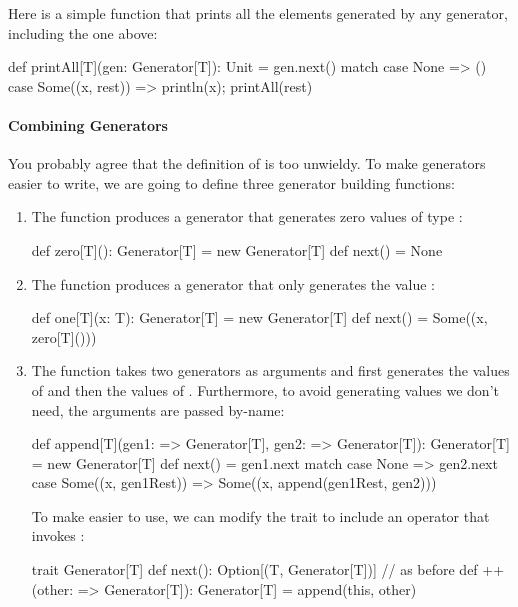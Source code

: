 \documentclass[9pt]{extbook}
\begin{document}
Here is a simple function that prints all the elements generated by any generator, including the
one above:
\begin{scalacode}
def printAll[T](gen: Generator[T]): Unit = gen.next() match {
  case None => ()
  case Some((x, rest)) => println(x); printAll(rest)
}
\end{scalacode}

\paragraph{Combining Generators} You probably agree that the definition of  is 
too unwieldy. To make generators easier to write, we are going to define three generator building
functions:

\begin{enumerate}

  \item The function  produces a generator that generates zero values of type :

  \begin{scalacode}
  def zero[T](): Generator[T] = new Generator[T] { def next() = None }
  \end{scalacode}

  \item The function  produces a generator that only generates the value :

  \begin{scalacode}
  def one[T](x: T): Generator[T] = new Generator[T] { def next() = Some((x, zero[T]())) }
  \end{scalacode}

  \item The function  takes two generators as arguments and first generates the
  values of  and then the values of . Furthermore, to avoid generating values
  we don't need, the arguments are passed by-name:

\begin{scalacode}
def append[T](gen1: => Generator[T], gen2: => Generator[T]): Generator[T] = new Generator[T] { 
  def next() = gen1.next match {
    case None => gen2.next
    case Some((x, gen1Rest)) => Some((x, append(gen1Rest, gen2)))
  }
}
\end{scalacode}

To make  easier to use, we can modify the  trait to include an operator
that invokes :
\begin{scalacode}
trait Generator[T] {
  def next(): Option[(T, Generator[T])] // as before
  def ++(other: => Generator[T]): Generator[T] = append(this, other)
}
\end{scalacode}

\end{enumerate}
\end{document}
